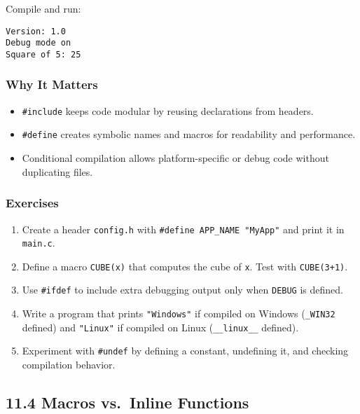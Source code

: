 \documentclass[
  letterpaper,
  DIV=11,
  numbers=noendperiod]{scrreprt}
\providecommand{\tightlist}{%
  \setlength{\itemsep}{0pt}\setlength{\parskip}{0pt}}
\begin{document}
Compile and run:

\begin{verbatim}
Version: 1.0
Debug mode on
Square of 5: 25
\end{verbatim}

\subsubsection{Why It Matters}\label{why-it-matters-49}

\begin{itemize}
\tightlist
\item
  \texttt{\#include} keeps code modular by reusing declarations from
  headers.
\item
  \texttt{\#define} creates symbolic names and macros for readability
  and performance.
\item
  Conditional compilation allows platform-specific or debug code without
  duplicating files.
\end{itemize}

\subsubsection{Exercises}\label{exercises-52}

\begin{enumerate}
\def\labelenumi{\arabic{enumi}.}
\tightlist
\item
  Create a header \texttt{config.h} with
  \texttt{\#define\ APP\_NAME\ "MyApp"} and print it in \texttt{main.c}.
\item
  Define a macro \texttt{CUBE(x)} that computes the cube of \texttt{x}.
  Test with \texttt{CUBE(3+1)}.
\item
  Use \texttt{\#ifdef} to include extra debugging output only when
  \texttt{DEBUG} is defined.
\item
  Write a program that prints \texttt{"Windows"} if compiled on Windows
  (\texttt{\_WIN32} defined) and \texttt{"Linux"} if compiled on Linux
  (\texttt{\_\_linux\_\_} defined).
\item
  Experiment with \texttt{\#undef} by defining a constant, undefining
  it, and checking compilation behavior.
\end{enumerate}

\subsection{11.4 Macros vs.~Inline
Functions}\label{macros-vs.-inline-functions}
\end{document}
